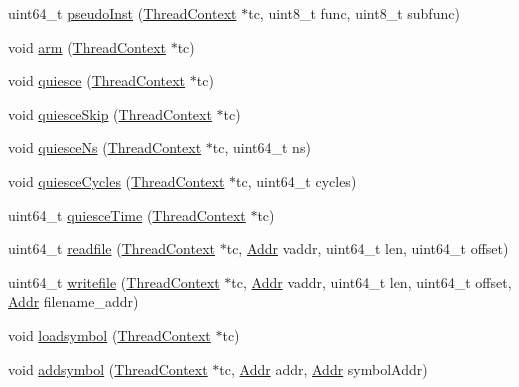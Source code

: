 \begin{DoxyCompactItemize}
\item 
uint64\_\-t \hyperlink{namespacePseudoInst_a469ba8e314952a0076e086dee22ea6de}{pseudoInst} (\hyperlink{classThreadContext}{ThreadContext} $\ast$tc, uint8\_\-t func, uint8\_\-t subfunc)
\item 
void \hyperlink{namespacePseudoInst_a04d21e0b7e79b39e05106d93cac907a7}{arm} (\hyperlink{classThreadContext}{ThreadContext} $\ast$tc)
\item 
void \hyperlink{namespacePseudoInst_a977b8b2deadbfd9c0976dca7b75cfa08}{quiesce} (\hyperlink{classThreadContext}{ThreadContext} $\ast$tc)
\item 
void \hyperlink{namespacePseudoInst_a73e782e05ef938409cc211fe11a22e5e}{quiesceSkip} (\hyperlink{classThreadContext}{ThreadContext} $\ast$tc)
\item 
void \hyperlink{namespacePseudoInst_a1783da8f7e3427cb3656ae88329c9106}{quiesceNs} (\hyperlink{classThreadContext}{ThreadContext} $\ast$tc, uint64\_\-t ns)
\item 
void \hyperlink{namespacePseudoInst_a70caa4a44963eb294bfddbf67cdfc5d9}{quiesceCycles} (\hyperlink{classThreadContext}{ThreadContext} $\ast$tc, uint64\_\-t cycles)
\item 
uint64\_\-t \hyperlink{namespacePseudoInst_a89bd6a436c203e630bc715feab90fe13}{quiesceTime} (\hyperlink{classThreadContext}{ThreadContext} $\ast$tc)
\item 
uint64\_\-t \hyperlink{namespacePseudoInst_a8dff656222f96d2cba431e2486c19ff1}{readfile} (\hyperlink{classThreadContext}{ThreadContext} $\ast$tc, \hyperlink{base_2types_8hh_af1bb03d6a4ee096394a6749f0a169232}{Addr} vaddr, uint64\_\-t len, uint64\_\-t offset)
\item 
uint64\_\-t \hyperlink{namespacePseudoInst_a719365f98235b44f6b4593985ece3f11}{writefile} (\hyperlink{classThreadContext}{ThreadContext} $\ast$tc, \hyperlink{base_2types_8hh_af1bb03d6a4ee096394a6749f0a169232}{Addr} vaddr, uint64\_\-t len, uint64\_\-t offset, \hyperlink{base_2types_8hh_af1bb03d6a4ee096394a6749f0a169232}{Addr} filename\_\-addr)
\item 
void \hyperlink{namespacePseudoInst_ad8e4a9db66f5b7328670cca9f9549da4}{loadsymbol} (\hyperlink{classThreadContext}{ThreadContext} $\ast$tc)
\item 
void \hyperlink{namespacePseudoInst_a5a43d039916d7f4388d084bcc450162d}{addsymbol} (\hyperlink{classThreadContext}{ThreadContext} $\ast$tc, \hyperlink{base_2types_8hh_af1bb03d6a4ee096394a6749f0a169232}{Addr} addr, \hyperlink{base_2types_8hh_af1bb03d6a4ee096394a6749f0a169232}{Addr} symbolAddr)

\end{DoxyCompactItemize}
